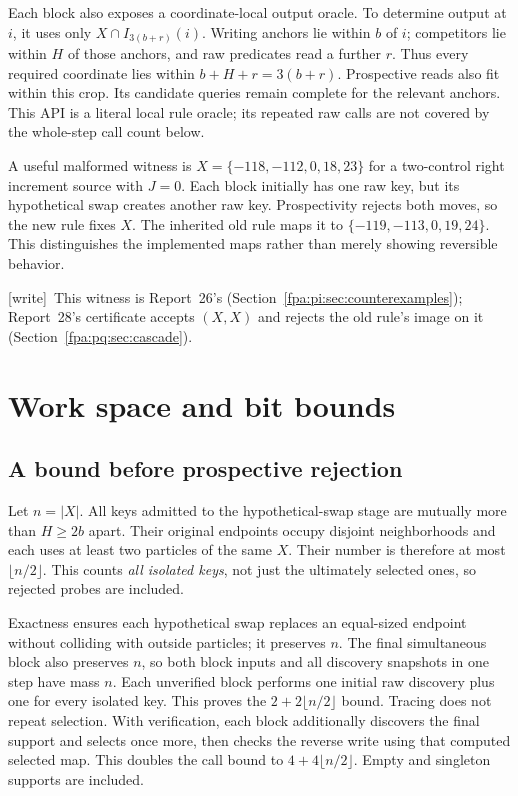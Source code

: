\documentclass[11pt,a4paper]{article}
\numberwithin{equation}{section}
\newcommand{\wtag}{\textup{[write]}}
\begin{document}
Each block also exposes a coordinate-local output oracle. To determine output at $i$, it uses only $X\cap I_{3(b+r)}(i)$. Writing anchors lie within $b$ of $i$; competitors lie within $H$ of those anchors, and raw predicates read a further $r$. Thus every required coordinate lies within $b+H+r=3(b+r)$. Prospective reads also fit within this crop. Its candidate queries remain complete for the relevant anchors. This API is a literal local rule oracle; its repeated raw calls are not covered by the whole-step call count below.

A useful malformed witness is $X=\{-118,-112,0,18,23\}$ for a two-control right increment source with $J=0$. Each block initially has one raw key, but its hypothetical swap creates another raw key. Prospectivity rejects both moves, so the new rule fixes $X$. The inherited old rule maps it to $\{-119,-113,0,19,24\}$. This distinguishes the implemented maps rather than merely showing reversible behavior.

\wtag\ This witness is Report~26's (Section~\ref{fpa:pi:sec:counterexamples}); Report~28's certificate accepts $(X,X)$ and rejects the old rule's image on it (Section~\ref{fpa:pq:sec:cascade}).

\section{Work space and bit bounds}\label{fpa:sp:sec:cost}
\subsection{A bound before prospective rejection}
Let $n=|X|$. All keys admitted to the hypothetical-swap stage are mutually more than $H\ge2b$ apart. Their original endpoints occupy disjoint neighborhoods and each uses at least two particles of the same $X$. Their number is therefore at most $\lfloor n/2\rfloor$. This counts \emph{all isolated keys}, not just the ultimately selected ones, so rejected probes are included.

Exactness ensures each hypothetical swap replaces an equal-sized endpoint without colliding with outside particles; it preserves $n$. The final simultaneous block also preserves $n$, so both block inputs and all discovery snapshots in one step have mass $n$. Each unverified block performs one initial raw discovery plus one for every isolated key. This proves the $2+2\lfloor n/2\rfloor$ bound. Tracing does not repeat selection. With verification, each block additionally discovers the final support and selects once more, then checks the reverse write using that computed selected map. This doubles the call bound to $4+4\lfloor n/2\rfloor$. Empty and singleton supports are included.
\end{document}
